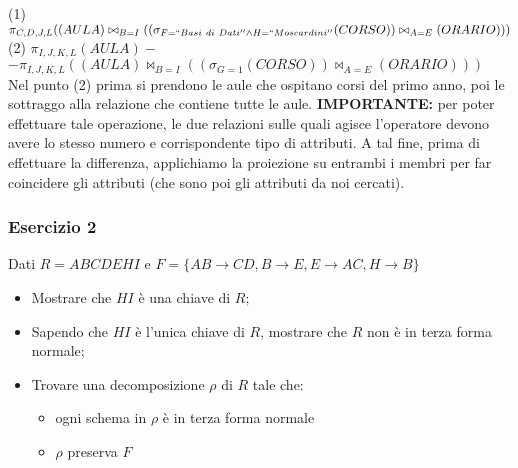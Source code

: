   \noindent(1) $\pi_{C, D, J, L}((AULA)\bowtie_{B=I}((\sigma_{F=``Basi\ di\ Dati'' \wedge H=``Moscardini''}(CORSO))\bowtie_{A=E}(ORARIO)))$\\
   (2) $\pi_{I, J, K, L}(AULA)-$ \\ $- \pi_{I, J, K, L}((AULA)\bowtie_{B=I}((\sigma_{G=1}(CORSO))\bowtie_{A=E}(ORARIO)))$\\

   Nel punto (2) prima si prendono le aule che ospitano corsi del primo anno, poi le sottraggo alla relazione che contiene tutte
   le aule. \textbf{IMPORTANTE:} per poter effettuare tale operazione, le due relazioni sulle quali agisce l'operatore devono avere
   lo stesso numero e corrispondente tipo di attributi. A tal fine, prima di effettuare la differenza, applichiamo la proiezione su 
   entrambi i membri per far coincidere gli attributi (che sono poi gli attributi da noi cercati).
  \subsubsection{Esercizio 2}
 Dati $R=ABCDEHI$ e $F=\{AB\rightarrow CD, B\rightarrow E, E\rightarrow AC, H\rightarrow B\}$
 \begin{itemize}
  \item Mostrare che $HI$ è una chiave di $R$;
  \item Sapendo che $HI$ è l'unica  chiave di $R$, mostrare che $R$ non è in terza forma normale;
  \item Trovare una decomposizione $\rho$ di $R$ tale che:
    \begin{itemize}
     \item ogni schema in $\rho$ è in terza forma normale
    \item $\rho$ preserva $F$
    \end{itemize}
 \end{itemize}
 

